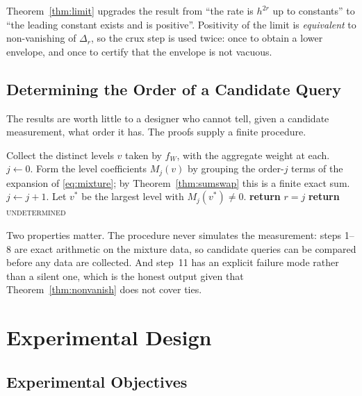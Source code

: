 \documentclass[conference]{IEEEtran}
\theoremstyle{definition}
\begin{document}
Theorem~\ref{thm:limit} upgrades the result from ``the rate is $h^{2r}$ up to constants'' to
``the leading constant exists and is positive''. Positivity of the limit is \emph{equivalent}
to non-vanishing of $\Delta_{r}$, so the crux step is used twice: once to obtain a lower
envelope, and once to certify that the envelope is not vacuous.

\subsection{Determining the Order of a Candidate Query}
\label{sec:procedure}

The results are worth little to a designer who cannot tell, given a candidate measurement,
what order it has. The proofs supply a finite procedure.

\begin{algorithm}[htbp]
\caption{Leakage order of a candidate measurement}
\label{alg:order}
\begin{algorithmic}[1]
\STATE Collect the distinct levels $v$ taken by $f_{W}$, with the aggregate weight at each.
\STATE $j\leftarrow0$.
\REPEAT
  \STATE Form the level coefficients $M_{j}(v)$ by grouping the order-$j$ terms of the
         expansion of \eqref{eq:mixture}; by Theorem~\ref{thm:sumswap} this is a finite
         exact sum.
    \STATE $j\leftarrow j+1$.
  \ENDIF
{}
\STATE Let $v^{*}$ be the largest level with $M_{j}(v^{*})\neq0$.
  \STATE \textbf{return} $r=j$ 
\ELSE
  \STATE \textbf{return} \textsc{undetermined} 
\ENDIF
\end{algorithmic}
\end{algorithm}

Two properties matter. The procedure never simulates the measurement: steps 1--8 are exact
arithmetic on the mixture data, so candidate queries can be compared before any data are
collected. And step~11 has an explicit failure mode rather than a silent one, which is the
honest output given that Theorem~\ref{thm:nonvanish} does not cover ties.

\section{Experimental Design}
\label{sec:expdesign}

\subsection{Experimental Objectives}
\end{document}
